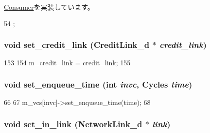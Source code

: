 \hyperlink{classConsumer_a3ea5f7af5db62cc24f4e40df9ea5c971}{Consumer}を実装しています。


\begin{DoxyCode}
54 {};
\end{DoxyCode}
\hypertarget{classInputUnit__d_aa66db9bde5f92aad3f5bbc61cc861d2a}{
\subsubsection[{set\_\-credit\_\-link}]{\setlength{\rightskip}{0pt plus 5cm}void set\_\-credit\_\-link ({\bf CreditLink\_\-d} $\ast$ {\em credit\_\-link})}}
\label{classInputUnit__d_aa66db9bde5f92aad3f5bbc61cc861d2a}



\begin{DoxyCode}
153     {
154         m_credit_link = credit_link;
155     }
\end{DoxyCode}
\hypertarget{classInputUnit__d_aeafc60409d8d5d509f37f72601c5c2e1}{
\subsubsection[{set\_\-enqueue\_\-time}]{\setlength{\rightskip}{0pt plus 5cm}void set\_\-enqueue\_\-time (int {\em invc}, \/  {\bf Cycles} {\em time})}}
\label{classInputUnit__d_aeafc60409d8d5d509f37f72601c5c2e1}



\begin{DoxyCode}
66     {
67         m_vcs[invc]->set_enqueue_time(time);
68     }
\end{DoxyCode}
\hypertarget{classInputUnit__d_aae75fe48fb1bda1d0df405f7913467d9}{
\subsubsection[{set\_\-in\_\-link}]{\setlength{\rightskip}{0pt plus 5cm}void set\_\-in\_\-link ({\bf NetworkLink\_\-d} $\ast$ {\em link})}}
\label{classInputUnit__d_aae75fe48fb1bda1d0df405f7913467d9}



